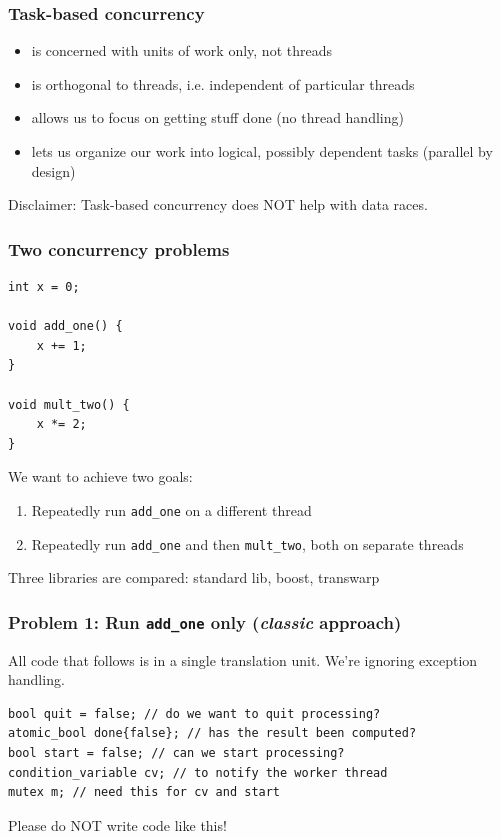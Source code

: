 \documentclass[12pt,aspectratio=169]{beamer}
\begin{document}
\begin{frame}[fragile]
\frametitle{Task-based concurrency}

\begin{itemize}
\item is concerned with units of work only, not threads
\item is orthogonal to threads, i.e. independent of particular threads
\item allows us to focus on getting stuff done (no thread handling)
\item lets us organize our work into logical, possibly dependent tasks (parallel by design)
\end{itemize}
\bigskip
\bigskip

Disclaimer: Task-based concurrency does NOT help with data races.

\end{frame}

\begin{frame}[fragile]
\frametitle{Two concurrency problems}

\begin{lstlisting}
int x = 0;

void add_one() {
    x += 1;
}

void mult_two() {
    x *= 2;
}
\end{lstlisting}

We want to achieve two goals:
\begin{enumerate}
\item Repeatedly run \lstinline{add_one} on a different thread
\item Repeatedly run \lstinline{add_one} and then \lstinline{mult_two}, both on separate threads
\end{enumerate}
\medskip

Three libraries are compared: standard lib, boost, transwarp
\end{frame}

\begin{frame}[fragile]
\frametitle{Problem 1: Run \lstinline{add_one} only (\textit{classic} approach)}

All code that follows is in a single translation unit. \newline
We're ignoring exception handling.

\bigskip
\bigskip

\begin{lstlisting}
bool quit = false; // do we want to quit processing?
atomic_bool done{false}; // has the result been computed?
bool start = false; // can we start processing?
condition_variable cv; // to notify the worker thread
mutex m; // need this for cv and start
\end{lstlisting}

\bigskip
\bigskip

Please do NOT write code like this!

\end{frame}
\end{document}
